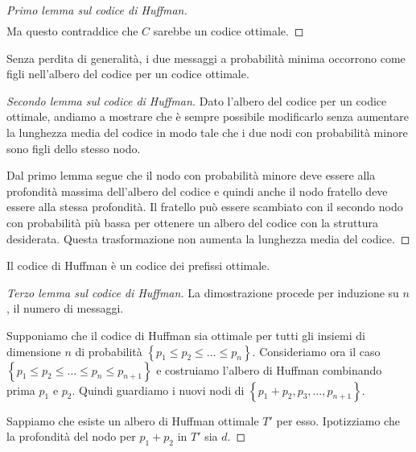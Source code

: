 \documentclass[\main/main.tex]{subfiles}
\begin{document}
\begin{multicols}{2}
\begin{proof}[Primo lemma sul codice di Huffman]
\begin{align*}
    \end{align*}
    Ma questo contraddice che \(C\) sarebbe un codice ottimale.
\end{proof}
\begin{lemma}
    Senza perdita di generalità, i due messaggi a probabilità minima occorrono come figli nell'albero del codice per un codice ottimale.
\end{lemma}
\begin{proof}[Secondo lemma sul codice di Huffman]
    Dato l'albero del codice per un codice ottimale, andiamo a mostrare che è sempre possibile modificarlo senza aumentare la lunghezza media del codice in modo tale che i due nodi con probabilità minore sono figli dello stesso nodo.
    
    Dal primo lemma segue che il nodo con probabilità minore deve essere alla profondità massima dell'albero del codice e quindi anche il nodo fratello deve essere alla stessa profondità. Il fratello può essere scambiato con il secondo nodo con probabilità più bassa per ottenere un albero del codice con la struttura desiderata. Questa trasformazione non aumenta la lunghezza media del codice. 
\end{proof}
\begin{lemma}
    Il codice di Huffman è un codice dei prefissi ottimale.
\end{lemma}
\begin{proof}[Terzo lemma sul codice di Huffman]
    La dimostrazione procede per induzione su \(n\), il numero di messaggi.
    
    Supponiamo che il codice di Huffman sia ottimale per tutti gli insiemi di dimensione \(n\) di probabilità \(\left\{p_{1} \leq p_{2} \leq \ldots \leq p_{n}\right\}\). Consideriamo ora il caso \(\left\{p_{1} \leq p_{2} \leq \ldots \leq p_{n} \leq p_{n+1}\right\}\) e costruiamo l'albero di Huffman combinando prima \(p_1\) e \(p_2\). Quindi guardiamo i nuovi nodi di \(\left\{p_{1}+p_{2}, p_{3}, \dots, p_{n+1}\right\}\).
    
    Sappiamo che esiste un albero di Huffman ottimale \(T'\) per esso. Ipotizziamo che la profondità del nodo per \(p_1 + p_2\) in \(T'\) sia \(d\).
    

\end{proof}
\end{multicols}
\end{document}
